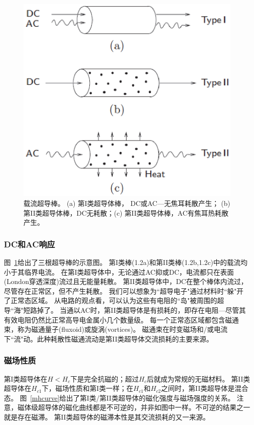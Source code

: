\begin{figure}[htbp]
	\centering
	\includegraphics[scale=0.6]{chpt1/figs/fig1.2.eps}
	\caption{
		载流超导棒。 (a) 第I类超导体棒， DC或AC---无焦耳耗散产生；
		(b) 第II类超导体棒，DC无耗散；(c) 第II类超导体棒，AC有焦耳热耗散产生。}\label{acdccurrent}
\end{figure}

\subsubsection{DC和AC响应}
图~\ref{acdccurrent}给出了三根超导棒的示意图。
第I类棒(1.2a)和第II类棒(1.2b,1.2c)中的载流均小于其临界电流。
在第I类超导体中，无论通过AC抑或DC，电流都只在表面(London穿透深度)流过且无能量耗散。
第II类超导体中，DC在整个棒体内流过，尽管存在正常区，但不产生耗散。
我们可以想象为``超导电子"通过材料时``躲"开了正常态区域。
从电路的观点看，可以认为这些有电阻的``岛"被周围的超导``海"短路掉了。
当通以AC时，第II类超导体是有损耗的，即存在电阻---尽管其有效电阻仍然比正常高导电金属小几个数量级。
每一个正常态区域都包含磁通束，称为磁通量子(fluxoid)或旋涡(vortices)。
磁通束在时变磁场和/或电流下``流"动。此种耗散性磁通流动是第II类超导体交流损耗的主要来源。

\subsubsection{磁场性质}
第I类超导体在$H<H_c$下是完全抗磁的；超过$H_c$后就成为常规的无磁材料。
第II类超导体在$H_{c1}$下，磁场性质和第I类一样；在$H_{c1}$和$H_{c2}$之间时，第II类超导体是混合态。
图~\ref{mhcurve}给出了第I类/第II类超导体的磁化强度与磁场强度的关系。
注意，磁体级超导体的磁化曲线都是不可逆的，并非如图中一样。不可逆的结果之一就是存在磁滞。
第II类超导体的磁滞本性是其交流损耗的又一来源。

